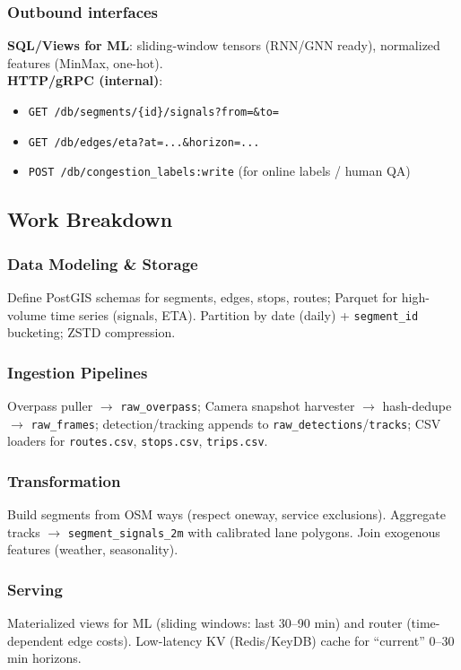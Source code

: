 \subsubsection{Outbound interfaces}
	\textbf{SQL/Views for ML}: sliding-window tensors (RNN/GNN ready), normalized features (MinMax, one-hot).\\
	\textbf{HTTP/gRPC (internal)}:
\begin{itemize}
  \item \texttt{GET /db/segments/\{id\}/signals?from=\&to=}
  \item \texttt{GET /db/edges/eta?at=...\&horizon=...}
  \item \texttt{POST /db/congestion\_labels:write} (for online labels / human QA)
\end{itemize}

\subsection{Work Breakdown}
\subsubsection{Data Modeling \& Storage}
Define PostGIS schemas for segments, edges, stops, routes; Parquet for high-volume time series (signals, ETA). Partition by date (daily) + \texttt{segment\_id} bucketing; ZSTD compression.

\subsubsection{Ingestion Pipelines}
Overpass puller $\rightarrow$ \texttt{raw\_overpass}; Camera snapshot harvester $\rightarrow$ hash-dedupe $\rightarrow$ \texttt{raw\_frames}; detection/tracking appends to \texttt{raw\_detections}/\texttt{tracks}; CSV loaders for \texttt{routes.csv}, \texttt{stops.csv}, \texttt{trips.csv}.
\subsubsection{Transformation}
Build segments from OSM ways (respect oneway, service exclusions). Aggregate tracks $\rightarrow$ \texttt{segment\_signals\_2m} with calibrated lane polygons. Join exogenous features (weather, seasonality).

\subsubsection{Serving}
Materialized views for ML (sliding windows: last 30--90 min) and router (time-dependent edge costs). Low-latency KV (Redis/KeyDB) cache for “current” 0--30 min horizons.

